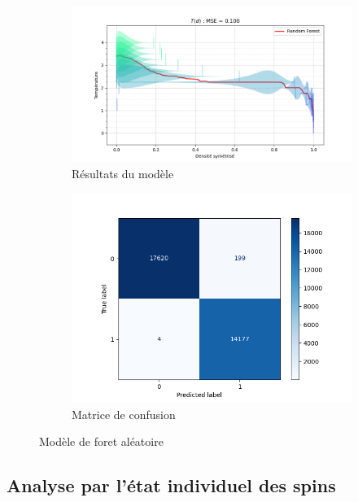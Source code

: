 \documentclass[11pt, parskip=half]{scrartcl} %
\begin{document}
\begin{figure}[h]
	\begin{subfigure}[c]{0.65\textwidth}
		\centering
		\includegraphics[width=1.1\linewidth]{./figures/forest.png}
		\caption{Résultats du modèle}
		\label{fig:forest}
	\end{subfigure}
	\begin{subfigure}[c]{0.3\textwidth}
		\centering
		\includegraphics[width=1.3\linewidth]{./figures/forest_matrix.png}
		\caption{Matrice de confusion}
		\label{fig:forest_matrix}
	\end{subfigure}
	\caption{Modèle de foret aléatoire}
\end{figure}

\subsection{Analyse par l'état individuel des spins}
\end{document}
